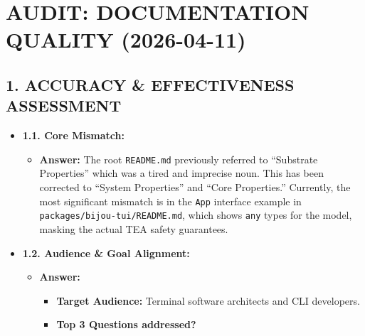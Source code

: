 \chapter{AUDIT: DOCUMENTATION QUALITY (2026-04-11)}\label{record-414}

\smallskip

\section{1. ACCURACY \& EFFECTIVENESS ASSESSMENT}\label{record-414-accuracy-effectiveness-assessment}

\begin{itemize}
\tightlist
\item
  \textbf{1.1. Core Mismatch:}

  \begin{itemize}
  \tightlist
  \item
    \textbf{Answer:} The root \texttt{R\allowbreak{}E\allowbreak{}A\allowbreak{}D\allowbreak{}M\allowbreak{}E\allowbreak{}.\allowbreak{}m\allowbreak{}d} previously referred to ``Substrate Properties'' which was a tired and imprecise noun. This has been corrected to ``System Properties'' and ``Core Properties.'' Currently, the most significant mismatch is in the \texttt{A\allowbreak{}p\allowbreak{}p} interface example in \texttt{p\allowbreak{}a\allowbreak{}c\allowbreak{}k\allowbreak{}a\allowbreak{}g\allowbreak{}e\allowbreak{}s\allowbreak{}/\allowbreak{}b\allowbreak{}i\allowbreak{}j\allowbreak{}o\allowbreak{}u\allowbreak{}-\allowbreak{}t\allowbreak{}u\allowbreak{}i\allowbreak{}/\allowbreak{}R\allowbreak{}E\allowbreak{}A\allowbreak{}D\allowbreak{}M\allowbreak{}E\allowbreak{}.\allowbreak{}m\allowbreak{}d}, which shows \texttt{a\allowbreak{}n\allowbreak{}y} types for the model, masking the actual TEA safety guarantees.
  \end{itemize}
\item
  \textbf{1.2. Audience \& Goal Alignment:}

  \begin{itemize}
  \tightlist
  \item
    \textbf{Answer:}

    \begin{itemize}
    \tightlist
    \item
      \textbf{Target Audience:} Terminal software architects and CLI developers.
    \item
      \textbf{Top 3 Questions addressed?}


\end{itemize}
\end{itemize}
\end{itemize}
